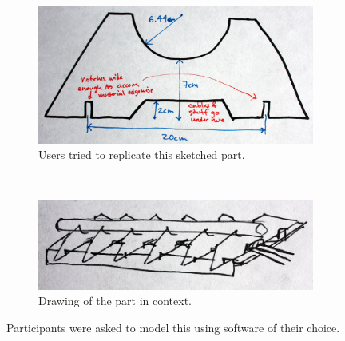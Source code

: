 \begin{figure}[t]
  \centering
  \begin{subfigure}[b]{0.7\textwidth}
    \centering
    \includegraphics[width=\textwidth]{img/laser-me-1.jpg}  
    \caption{Users tried to replicate this sketched part.}
    \label{fig:interview-sketch-1} 
  \end{subfigure}
  \\
  \vspace{12pt}
  \begin{subfigure}[b]{0.7\textwidth}
    \centering
    \includegraphics[width=\textwidth]{img/laser-me-2.jpg}  
    \caption{Drawing of the part in context.}
    \label{fig:interview-sketch-2} 
  \end{subfigure}
  \caption[Sketch From Designer Interview]{Participants were asked to
    model this using software of their choice.}
  \label{fig:interview-sketch}
\end{figure}
